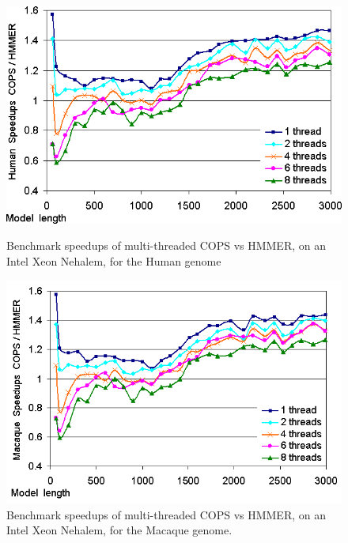 \begin{figure}[h!]
    \begin{minipage}{0.48\linewidth}
		\centering
		\includegraphics[scale=0.46]{graphics/threads-tags-speedups-human.png}
		\caption[Speedups of the multi-threaded COPS vs HMMER, Intel Xeon, Human] 
		{Benchmark speedups of multi-threaded COPS vs HMMER, on an Intel Xeon Nehalem, for the Human genome}
		\label{threads-tags-speedups-human}
    \end{minipage}
    \hspace{0.04\linewidth}
    \begin{minipage}{0.48\linewidth}
		\centering
		\includegraphics[scale=0.46]{graphics/threads-tags-speedups-macaque.png}
		\caption[Speedups of the multi-threaded COPS vs HMMER, Intel Xeon, Macaque] 
		{Benchmark speedups of multi-threaded COPS vs HMMER, on an Intel Xeon Nehalem, for the Macaque genome.}
		\label{threads-tags-speedups-macaque}
    \end{minipage}
\end{figure} 

